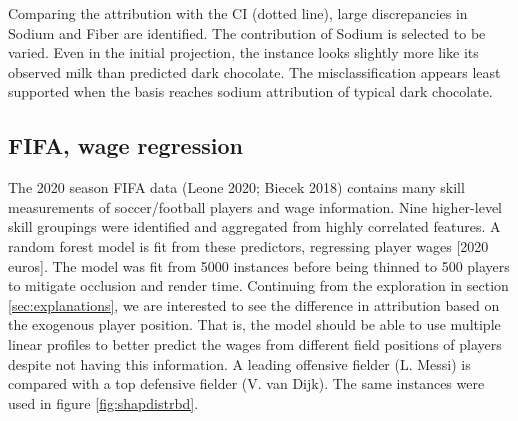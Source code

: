 \documentclass[
]{article}
\begin{document}
Comparing the attribution with the CI (dotted line), large discrepancies in Sodium and Fiber are identified. The contribution of Sodium is selected to be varied. Even in the initial projection, the instance looks slightly more like its observed milk than predicted dark chocolate. The misclassification appears least supported when the basis reaches sodium attribution of typical dark chocolate.

\hypertarget{fifa-wage-regression}{%
\subsection{FIFA, wage regression}\label{fifa-wage-regression}}

The 2020 season FIFA data (Leone 2020; Biecek 2018) contains many skill measurements of soccer/football players and wage information. Nine higher-level skill groupings were identified and aggregated from highly correlated features. A random forest model is fit from these predictors, regressing player wages {[}2020 euros{]}. The model was fit from 5000 instances before being thinned to 500 players to mitigate occlusion and render time. Continuing from the exploration in section \ref{sec:explanations}, we are interested to see the difference in attribution based on the exogenous player position. That is, the model should be able to use multiple linear profiles to better predict the wages from different field positions of players despite not having this information. A leading offensive fielder (L. Messi) is compared with a top defensive fielder (V. van Dijk). The same instances were used in figure \ref{fig:shapdistrbd}.
\end{document}
